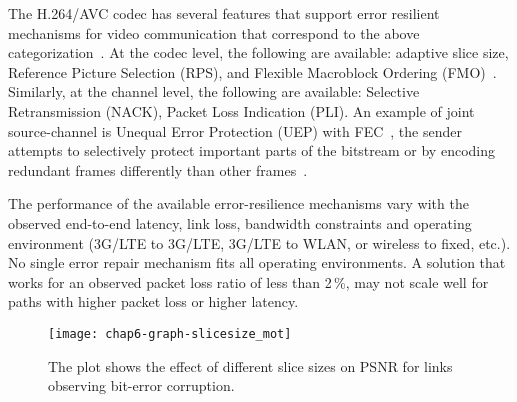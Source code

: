 The H.264/AVC codec has several features that support error resilient
mechanisms for video communication that correspond to the above
categorization~\cite{310669}. At the codec level, the following are available:
adaptive slice size, Reference Picture Selection (RPS), and Flexible
Macroblock Ordering (FMO)~\cite{err_res_h264_std, wenger_ott_jscc}. Similarly,
at the channel level, the following are available: Selective Retransmission
(NACK), Packet Loss Indication (PLI). An example of joint source-channel is
Unequal Error Protection (UEP) with FEC~\cite{wang00review}, the sender
attempts to selectively protect important parts of the bitstream or by
encoding redundant frames differently than other frames~\cite{ervcuupkp}.

The performance of the available error-resilience mechanisms vary with the
observed end-to-end latency, link loss, bandwidth constraints and operating
environment (3G/LTE to 3G/LTE, 3G/LTE to WLAN, or wireless to fixed, etc.). No
single error repair mechanism fits all operating environments. A solution that
works for an observed packet loss ratio of less than 2\,\%, may not scale well
for paths with higher packet loss or higher latency.


\begin{figure}
\centerline {
\texttt{[image: chap6-graph-slicesize\_mot]}
}
\caption{The plot shows the effect of different slice sizes on PSNR for links
observing bit-error corruption.}
\label{fig:slicesize_mot}
\end{figure}

